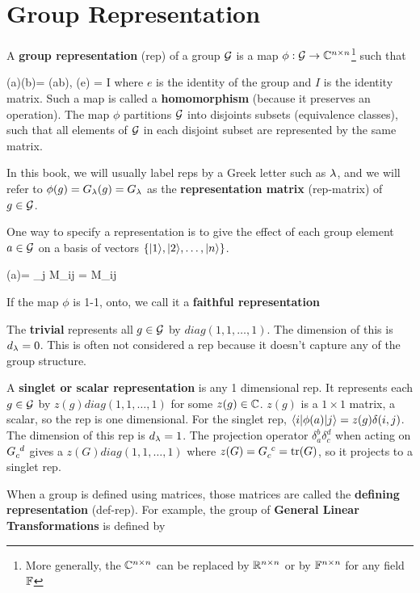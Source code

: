\section{Group  Representation}

A {\bf group representation} (rep)
of a group ${\cal G}$
is a map $\phi: {\cal G}\rightarrow { \mathbb{C}}^{n\times n}$\footnote{More generally, the ${ \mathbb{C}}^{n\times n}$ can be replaced by ${ \mathbb{R}}^{n\times n}$ or by ${ \mathbb{F}}^{n\times n}$ for any field ${ \mathbb{F}}$} such that

\beq
\phi(a)\phi(b)=
\phi(ab),
\quad \phi(e) = I
\eeq
where $e$ is the
identity of the group
and $I$ 
is the identity matrix.
Such a map is called a {\bf homomorphism}
(because it preserves an operation).
The map $\phi$ 
partitions ${\cal G}$
into disjoints subsets (equivalence classes),
such that all elements of ${\cal G}$ in each disjoint subset 
are represented by the same matrix.

In this book, 
we will usually
label reps by a 
Greek letter
such as $\lambda$,
and we will refer to
$\phi(g)=G_\lambda(g)=G_\lambda$ as the
{\bf representation matrix} (rep-matrix) of $g\in{\cal G}$.

One  way to specify a representation is
to give the effect of each group element $a\in {\cal G}$ on a basis of vectors $\{|1\rangle, |2\rangle, \dots, |n\rangle\}$.


\beq
\phi (a)= \sum_j M_{ij}
\implies {} = M_{ij}
\eeq

If the map $\phi$
is 1-1, onto, we call it a {\bf faithful representation} 

The {\bf trivial }
represents all $g\in {\cal G}$
by  $diag(1,1, \dots, 1)$.
The dimension 
of this  is $d_\lambda=0$.
This  is often not
considered a rep because it
doesn't capture any of the group structure.

A {\bf singlet or scalar representation}
is any 1 dimensional rep. It represents each
$g\in {\cal G}$
by  $ z(g) diag(1,1, \dots, 1)$
for some $z(g)\in{ \mathbb{C}}$.
$z(g)$ is a $1\times 1$ matrix, a scalar,
so the rep is one dimensional.
For the singlet rep, $\left\langle i|\phi(a)|j\right\rangle=z(g)
\delta(i,j)$.
The dimension 
of this rep is $d_\lambda=1$.
The projection operator
$\delta_a^b \delta_c^d$
when acting on $G\indices{_c^d}$
gives a $ z(G) diag(1,1, \dots, 1)$
where $z(G)=G\indices{_c^c}=\tr(G)$, so it
projects to a singlet rep.



When a group is 
defined using matrices, those
matrices are called the {\bf defining representation} (def-rep). For example,
the group
of {\bf General Linear Transformations}
is defined by

